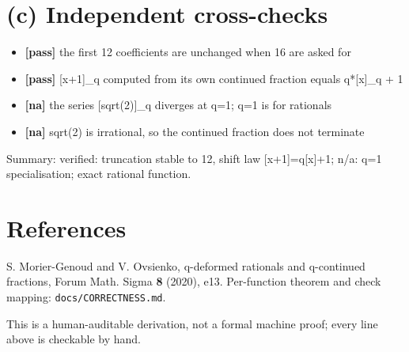 \documentclass[11pt]{article}
\begin{document}
\section*{(c) Independent cross-checks}
\begin{itemize}
\item \textbf{[pass]} the first 12 coefficients are unchanged when 16 are asked for
\item \textbf{[pass]} [x+1]\_q computed from its own continued fraction equals q*[x]\_q + 1
\item \textbf{[na]} the series [sqrt(2)]\_q diverges at q=1; q=1 is for rationals
\item \textbf{[na]} sqrt(2) is irrational, so the continued fraction does not terminate
\end{itemize}
Summary: verified: truncation stable to 12, shift law [x+1]=q[x]+1; n/a: q=1 specialisation; exact rational function.

\section*{References}
S. Morier-Genoud and V. Ovsienko, q-deformed rationals and q-continued
fractions, Forum Math. Sigma \textbf{8} (2020), e13. Per-function theorem and
check mapping: \texttt{docs/CORRECTNESS.md}.

\medskip
\noindent This is a human-auditable derivation, not a formal machine proof;
every line above is checkable by hand.
\end{document}
